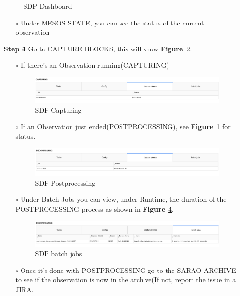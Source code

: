 \begin{itemize}
\begin{figure}[!thb]
	\caption{SDP Dashboard}
	\label{fig:image16}
\end{figure}

\begin{itemize}
	\item[$\circ$] Under MESOS STATE, you can see the status of the current observation
\end{itemize}


\item[\textbf{Step 3}] Go to CAPTURE BLOCKS, this will show \textbf{Figure}~\ref{fig:image5}.
\begin{itemize}
	\item[$\circ$] If there’s an Observation running(CAPTURING)


\begin{figure}[!thb]
	\centering
	\includegraphics[scale=0.23]{Chapters/images/image5.png}
	
	\caption{SDP Capturing}
	\label{fig:image5}
\end{figure}
\item[$\circ$] If an Observation just ended(POSTPROCESSING), see \textbf{Figure}~\ref{fig:image16} for status. 

\begin{figure}[!thb]
	\centering
	\includegraphics[scale=0.23]{Chapters/images/image92.png}
	
	\caption{SDP Postprocessing}
	\label{fig:image92}
\end{figure}
\item[$\circ$] Under Batch Jobs you can view, under Runtime, the duration of the POSTPROCESSING process  as shown in \textbf{Figure}~\ref{fig:image13}.

\begin{figure}[!thb]
	\centering
	\includegraphics[scale=0.23]{Chapters/images/image13.png}
	
	\caption{SDP batch jobs}
	\label{fig:image13}
\end{figure}
\item[$\circ$] Once it’s done with POSTPROCESSING go to the SARAO ARCHIVE to see if the observation is now in the archive(If not, report the issue in a JIRA.
\end{itemize}

\end{itemize}
